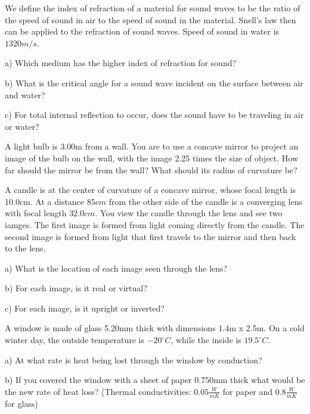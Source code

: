 \documentclass[10pt]{article}
\newenvironment{problem}[2][Problem]{\begin{trivlist}
\item[\hskip \labelsep {\bfseries #1}\hskip \labelsep {\bfseries #2.}]}{\end{trivlist}}
\begin{document}
\begin{problem}{4}
We define the index of refraction of a material for sound waves to be the ratio of the speed of sound in air to the speed of sound in the material. Snell's law then can be applied to the refraction of sound waves. Speed of sound in water is $1320 m/s$.
\item a) Which medium has the higher index of refraction for sound?
\item b) What is the critical angle for a sound wave incident on the surface between air and water?
\item c) For total internal reflection to occur, does the sound have to be traveling in air or water?
\end{problem}

\begin{problem}{5}
A light bulb is 3.00m from a wall. You are to use a concave mirror to project an image of the bulb on the wall, with the image 2.25 times the size of object. How far should the mirror be from the wall? What should its radius of curvature be?
\end{problem}

\begin{problem}{6}
A candle is at the center of curvature of a concave mirror, whose focal length is 10.0cm. At a distance $85cm$ from the other side of the candle is a converging lens with focal length $32.0cm$. You view the candle through the lens and see two iamges. The first image is formed from light coming directly from the candle. The second image is formed from light that first travels to the mirror and then back to the lens.
\item a) What is the location of each image seen through the lens?
\item b) For each image, is it real or virtual?
\item c) For each image, is it upright or inverted?
\end{problem}

\begin{problem}{7}
A window is made of glass 5.20mm thick with dimensions 1.4m x 2.5m. On a cold winter day, the outside temperature is $-20^\circ C$, while the inside is $19.5^\circ C$.
\item a) At what rate is heat being lost through the window by conduction?
\item b) If you covered the window with a sheet of paper 0.750mm thick what would be the new rate of heat loss? (Thermal conductivities: $0.05 \frac{W}{mK}$ for  paper and $0.8 \frac{W}{mK}$ for glass)
\end{problem}
\end{document}
